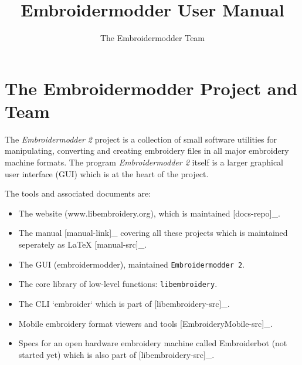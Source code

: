 \usepackage{amsmath}
\usepackage{listings}
\usepackage{hyperref}
\usepackage{multicol}
\usepackage{graphicx}

\lstset{
  basicstyle=\footnotesize\ttfamily
}

%
%
%

\newcommand{\emversion}{1.90.0}
\newcommand{\libembversion}{1.0.0}

\title{Embroidermodder User Manual}
\author{The Embroidermodder Team}


\maketitle

\tableofcontents

\section{The Embroidermodder Project and Team}

The \emph{Embroidermodder 2} project is a collection of small software utilities for
manipulating, converting and creating embroidery files in all major embroidery
machine formats. The program \emph{Embroidermodder 2} itself is a larger graphical
user interface (GUI) which is at the heart of the project.

The tools and associated documents are:

\begin{itemize}
\item The website (www.libembroidery.org), which is maintained [docs-repo]_.
\item The manual [manual-link]_ covering all these projects which is maintained seperately as LaTeX [manual-src]_.
\item The GUI (embroidermodder), maintained \texttt{Embroidermodder 2}.
\item The core library of low-level functions: \texttt{libembroidery}.
\item The CLI `embroider` which is part of [libembroidery-src]_.
\item Mobile embroidery format viewers and tools [EmbroideryMobile-src]_.
\item Specs for an open hardware embroidery machine called Embroiderbot (not started yet) which is also part of [libembroidery-src]_.
\end{itemize}

